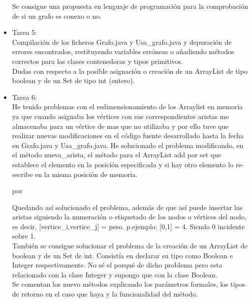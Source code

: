 \begin{itemize}
Se consigue una propuesta en lenguaje de programación para la comprobación de si un grafo es conexo o no. \\

\item Tarea 5:\\
Compilación de los ficheros Grafo.java y Usa\_grafo.java y depuración de errores encontrados, restituyendo variables erróneas o añadiendo métodos correctos para las clases contenedoras y tipos primitivos.\\

Dudas con respecto a la posible asignación o creación de un ArrayList de tipo boolean y de un Set de tipo int (entero).\\

\item Tarea 6:\\
He tenido problemas con el redimensionamiento de los Arraylist en memoria ya que cuando asignaba los vértices con sus correspondientes aristas me almacenaba para un vértice de mas que no utilizaba y por ello tuve que realizar nuevas modificaciones en el código fuente desarrollado hasta la fecha en Grafo.java y Usa\_grafo.java. He solucionado el problema modificando, en el método nueva\_arista, el método para el ArrayList add por set que establece el elemento en la posición especificada y si hay otro elemento lo re-escribe en la misma posición de memoria.



por



Quedando así solucionado el problema, además de que así puede insertar las aristas siguiendo la numeración o etiquetado de los nodos o vértices del nodo, es decir, [vertice\_i,vertice\_j] = peso. p.ejemplo: [0,1] = 4. Siendo 0 incidente sobre 1.\\

También se consigue solucionar el problema de la creación de un ArrayList de boolean y de un Set de int. Consistía en declarar su tipo como Boolean e Integer respectivamente. No sé el porqué de dicho problema pero esta relacionado con la clase Integer y supongo que con la clase Boolean.\\

Se comentan los nuevo métodos explicando los parámetros formales, los tipos de retorno en el caso que haya y la funcionalidad del método.\\


\end{itemize}
